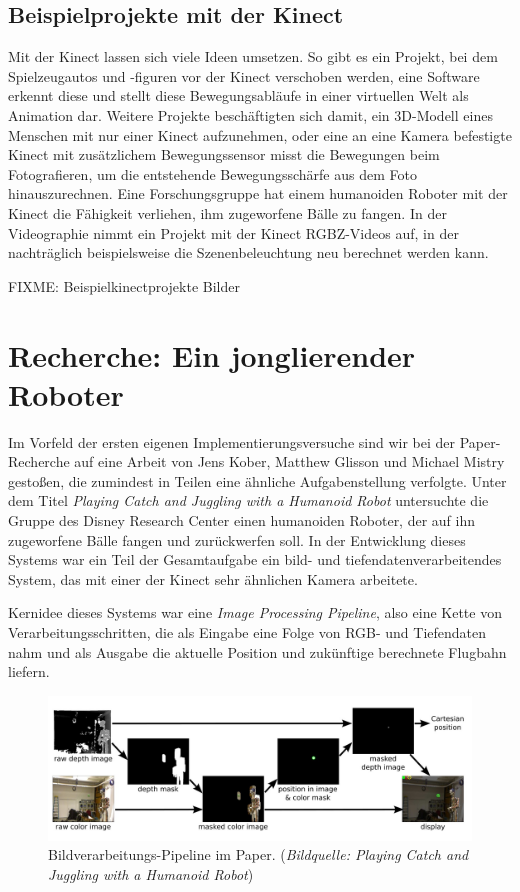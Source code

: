 \documentclass[12pt,a4paper,ngerman]{scrartcl}
\begin{document}
\subsection{Beispielprojekte mit der Kinect}

Mit der Kinect lassen sich viele Ideen umsetzen. So gibt es ein Projekt, bei dem Spielzeugautos und
-figuren vor der Kinect verschoben werden, eine Software erkennt diese und stellt diese Bewegungsabläufe
in einer virtuellen Welt als Animation dar.\cite{3dpuppetry} Weitere Projekte beschäftigten sich
damit, ein 3D-Modell eines Menschen mit nur einer Kinect aufzunehmen,\cite{kinectavatar} oder eine an eine Kamera
befestigte Kinect mit zusätzlichem Bewegungssensor misst die Bewegungen beim Fotografieren, um die
entstehende Bewegungsschärfe aus dem Foto hinauszurechnen.\cite{motiondeblurring} Eine Forschungsgruppe
hat einem humanoiden Roboter mit der Kinect die Fähigkeit verliehen, ihm zugeworfene Bälle zu fangen.\cite{kober}
In der Videographie nimmt ein Projekt mit der Kinect RGBZ-Videos auf, in der nachträglich beispielsweise die
Szenenbeleuchtung neu berechnet werden kann.\cite{rgbzvideos}

{\color{red} FIXME: Beispielkinectprojekte Bilder}

\section{Recherche: Ein jonglierender Roboter} 

Im Vorfeld der ersten eigenen Implementierungsversuche sind wir bei der 
Paper-Recherche auf eine Arbeit von Jens Kober, Matthew Glisson und Michael Mistry
gestoßen, die zumindest in Teilen eine ähnliche Aufgabenstellung verfolgte.
Unter dem Titel {\em Playing Catch and Juggling with a Humanoid Robot}\cite{kober}
untersuchte die Gruppe des Disney Research Center\cite{disneyresearch} einen
humanoiden Roboter, der auf ihn zugeworfene Bälle fangen und zurückwerfen soll.
In der Entwicklung dieses Systems war ein Teil der Gesamtaufgabe ein 
bild- und tiefendatenverarbeitendes System, das mit einer der Kinect sehr ähnlichen
Kamera arbeitete.

Kernidee dieses Systems war eine \textit{Image Processing Pipeline}, also eine
Kette von Verarbeitungsschritten, die als Eingabe eine Folge von RGB- und Tiefendaten
nahm und als Ausgabe die aktuelle Position und zukünftige berechnete Flugbahn 
liefern. 

\begin{figure}[H]
    \centering
    \includegraphics[scale=0.31]{img/koberpipeline.jpg}
    \caption{Bildverarbeitungs-Pipeline im Paper. ({\em Bildquelle: Playing Catch and Juggling with a Humanoid Robot\cite{kober}})}
    \label{koberpipeline}
\end{figure}
\end{document}

